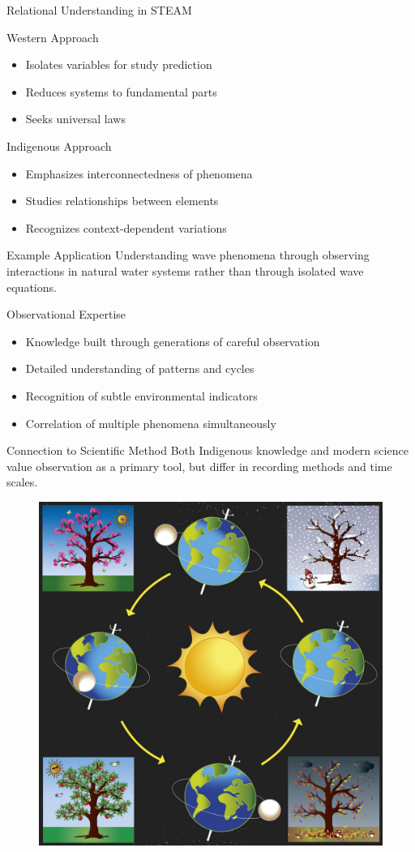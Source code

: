 \documentclass{beamer}
\begin{document}
\begin{frame}{Relational Understanding in STEAM}
    \begin{block}{Western Approach}
        \begin{itemize}
            \item Isolates variables for study prediction
            \item Reduces systems to fundamental parts
            \item Seeks universal laws
        \end{itemize}
    \end{block}
    
    \begin{block}{Indigenous Approach}
        \begin{itemize}
            \item Emphasizes interconnectedness of phenomena
            \item Studies relationships between elements
            \item Recognizes context-dependent variations
        \end{itemize}
    \end{block}
    
    \begin{exampleblock}{Example Application}
        Understanding wave phenomena through observing interactions in natural water systems rather than through isolated wave equations.
    \end{exampleblock}
\end{frame}

\begin{frame}{Observational Expertise}
    \begin{itemize}
        \item Knowledge built through generations of careful observation
        \item Detailed understanding of patterns and cycles
        \item Recognition of subtle environmental indicators
        \item Correlation of multiple phenomena simultaneously
    \end{itemize}
    
    \begin{alertblock}{Connection to Scientific Method}
        Both Indigenous knowledge and modern science value observation as a primary tool, but differ in recording methods and time scales.
    \end{alertblock}
    
   \begin{figure}
       \centering
       \includegraphics[width=0.3\linewidth]{cs12-earth-seasons-diagram.jpg}
   \end{figure}
\end{frame}
\end{document}
